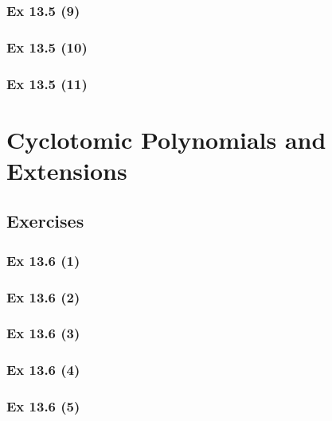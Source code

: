 \subsubsection{Ex 13.5 (9)}\label{sec:Ex_13.5.9}

\subsubsection{Ex 13.5 (10)}\label{sec:Ex_13.5.10}

\subsubsection{Ex 13.5 (11)}\label{sec:Ex_13.5.11}

\newpage		%

\section{Cyclotomic Polynomials and Extensions}\label{sec:13.6}	
\subsection*{Exercises}\label{sec:13.6_Exercises}

\subsubsection{Ex 13.6 (1)}\label{sec:Ex_13.6.1}

\subsubsection{Ex 13.6 (2)}\label{sec:Ex_13.6.2}

\subsubsection{Ex 13.6 (3)}\label{sec:Ex_13.6.3}

\subsubsection{Ex 13.6 (4)}\label{sec:Ex_13.6.4}

\subsubsection{Ex 13.6 (5)}\label{sec:Ex_13.6.5}

